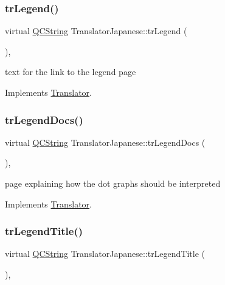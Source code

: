 \subsubsection{\texorpdfstring{trLegend()}{trLegend()}}
{\footnotesize\ttfamily virtual \mbox{\hyperlink{class_q_c_string}{Q\+C\+String}} Translator\+Japanese\+::tr\+Legend (\begin{DoxyParamCaption}{ }\end{DoxyParamCaption})\hspace{0.3cm}{\ttfamily [inline]}, {\ttfamily [virtual]}}

text for the link to the legend page 

Implements \mbox{\hyperlink{class_translator}{Translator}}.

\mbox{\label{class_translator_japanese_a3e6100664d0cca416bc9c36eb6ed7aab}} 
\subsubsection{\texorpdfstring{trLegendDocs()}{trLegendDocs()}}
{\footnotesize\ttfamily virtual \mbox{\hyperlink{class_q_c_string}{Q\+C\+String}} Translator\+Japanese\+::tr\+Legend\+Docs (\begin{DoxyParamCaption}{ }\end{DoxyParamCaption})\hspace{0.3cm}{\ttfamily [inline]}, {\ttfamily [virtual]}}

page explaining how the dot graph\textquotesingle{}s should be interpreted 

Implements \mbox{\hyperlink{class_translator}{Translator}}.

\mbox{\label{class_translator_japanese_a51f0d8b9dcc0f2062396e6684e5a1b33}} 
\subsubsection{\texorpdfstring{trLegendTitle()}{trLegendTitle()}}
{\footnotesize\ttfamily virtual \mbox{\hyperlink{class_q_c_string}{Q\+C\+String}} Translator\+Japanese\+::tr\+Legend\+Title (\begin{DoxyParamCaption}{ }\end{DoxyParamCaption})\hspace{0.3cm}{\ttfamily [inline]}, {\ttfamily [virtual]}}

